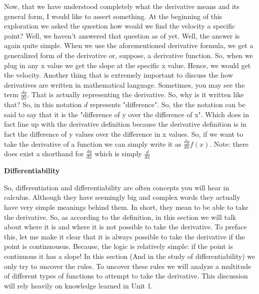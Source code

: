 \documentclass{article}
\begin{document}
\newline
\newline
Now, that we have understood completely what the derivative means and its general form, I would like to assert something. At the beginning of this exploration we asked the question how would we find the velocity a specific point? Well, we haven't answered that question as of yet. Well, the answer is again quite simple. When we use the aforementioned derivative formula, we get a generalized form of the derivative or, suppose, a derivative function. So, when we plug in any x value we get the slope at the specific x value. Hence, we would get the velocity.
\newline
\newline
Another thing that is extremely important to discuss the how derivatives are written in mathematical language. Sometimes, you may see the term $\frac{dy}{dx}$. That is actually representing the derivative. So, why is it written like that? So, in this notation $d$ represents "difference". So, the the notation can be said to say that it is the "difference of y over the difference of x". Which does in fact line up with the derivative definition because the derivative definition is in fact the difference of y values over the difference in x values. So, if we want to take the derivative of a function we can simply write it as $\frac{dy}{dx} f(x)$. Note: there does exist a shorthand for  $\frac{dy}{dx}$ which is simply $\frac{d}{dx}$ 
\begin{center}
    \textbf{Differentiability}
\end{center}
So, differentiation and differentiability are often concepts you will hear in calculus. Although they have seemingly big and complex words they actually have very simple meanings behind them. In short, they mean to be able to take the derivative. So, as according to the definition, in this section we will talk about where it is and where it is not possible to take the derivative. 
\newline
\newline
To preface this, let me make it clear that it is always possible to take the derivative if the point is continuousus. Because, the logic is relatively simple: if the point is continuous it has a slope! In this section (And in the study of differentiability) we only try to uncover the rules. To uncover these rules we will analyze a multitude of different types of functions to attempt to take the derivative. This discussion will rely heavily on knowledge learned in Unit 1.
\newline
\end{document}
